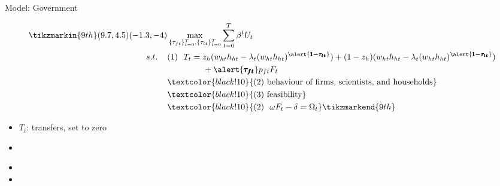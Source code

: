 \documentclass[11pt,aspectratio=169]{beamer}
\begin{document}
\addtocounter{framenumber}{-1}
\begin{frame}{Model: Government}
	\begin{minipage}[t!]{1\textwidth}
		\begin{align*}
		\tikzmarkin{9th}(9.7,4.5)(-1.3,-4)
		&\max_{\{\tau_{ft}\}_{t=0}^{T}, \{\tau_{lt}\}_{t=0}^{T}} \sum_{t=0}^{T}\beta^t U_{t}\\
		s.t. \hspace{4mm}
		&(1)\ \ T_t= z_h(w_{ht}h_{ht}-\lambda_t(w_{ht}h_{ht})^{\alert{\pmb{1-\tau_{lt}}}})+(1-z_h)(w_{ht}h_{ht}-\lambda_t(w_{ht}h_{ht})^{\alert{\pmb{1-\tau_{lt}}}})\\ & \hspace{15mm }+\alert{\pmb{\tau_{ft}}}p_{ft}F_{t}\\
		& \textcolor{black!10}{(2)\ \text{behaviour of firms, scientists, and households}}\\
		& \textcolor{black!10}{(3)\ \text{feasibility} }\\
		&\textcolor{black!10}{
			(2)\ \  \omega F_t-\delta =\Omega_t }
		\tikzmarkend{9th}
		\end{align*}
	\end{minipage}
	
	\small
	\vspace{0mm}
	\begin{minipage}[t!]{0.35\textwidth}
		\vspace{7mm}
		\begin{itemize}
			\item[] $T_t$: transfers, set to zero  \vspace{0mm}
			\item[] 
		\end{itemize}
	\end{minipage}
	\begin{minipage}[t!]{0.6\textwidth}
		\vspace{8mm}
		\begin{itemize}
			\item[]%
			\vspace{0mm}	
			\item[] %
		\end{itemize}
	\end{minipage}
\end{frame}
\end{document}
